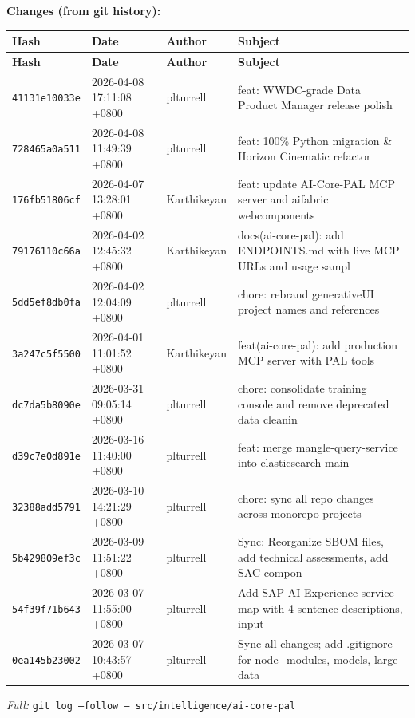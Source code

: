 \documentclass[11pt,a4paper]{article}
\begin{document}
\textbf{Changes (from git history):}
\begin{longtable}{|p{2.2cm}|p{3.2cm}|l|p{6cm}|}
\hline \textbf{Hash} & \textbf{Date} & \textbf{Author} & \textbf{Subject} \\ \hline \endfirsthead
\hline \textbf{Hash} & \textbf{Date} & \textbf{Author} & \textbf{Subject} \\ \hline \endhead
\texttt{41131e10033e} & 2026-04-08 17:11:08 +0800 & plturrell & feat: WWDC-grade Data Product Manager release polish \\
\texttt{728465a0a511} & 2026-04-08 11:49:39 +0800 & plturrell & feat: 100\% Python migration \& Horizon Cinematic refactor \\
\texttt{176fb51806cf} & 2026-04-07 13:28:01 +0800 & Karthikeyan & feat: update AI-Core-PAL MCP server and aifabric webcomponents \\
\texttt{79176110c66a} & 2026-04-02 12:45:32 +0800 & Karthikeyan & docs(ai-core-pal): add ENDPOINTS.md with live MCP URLs and usage sampl \\
\texttt{5dd5ef8db0fa} & 2026-04-02 12:04:09 +0800 & plturrell & chore: rebrand generativeUI project names and references \\
\texttt{3a247c5f5500} & 2026-04-01 11:01:52 +0800 & Karthikeyan & feat(ai-core-pal): add production MCP server with PAL tools \\
\texttt{dc7da5b8090e} & 2026-03-31 09:05:14 +0800 & plturrell & chore: consolidate training console and remove deprecated data cleanin \\
\texttt{d39c7e0d891e} & 2026-03-16 11:40:00 +0800 & plturrell & feat: merge mangle-query-service into elasticsearch-main \\
\texttt{32388add5791} & 2026-03-10 14:21:29 +0800 & plturrell & chore: sync all repo changes across monorepo projects \\
\texttt{5b429809ef3c} & 2026-03-09 11:51:22 +0800 & plturrell & Sync: Reorganize SBOM files, add technical assessments, add SAC compon \\
\texttt{54f39f71b643} & 2026-03-07 11:55:00 +0800 & plturrell & Add SAP AI Experience service map with 4-sentence descriptions, input  \\
\texttt{0ea145b23002} & 2026-03-07 10:43:57 +0800 & plturrell & Sync all changes; add .gitignore for node\_modules, models, large data  \\
\hline
\end{longtable}
\textit{Full:} \texttt{git log --follow -- src/intelligence/ai-core-pal}
\end{document}
